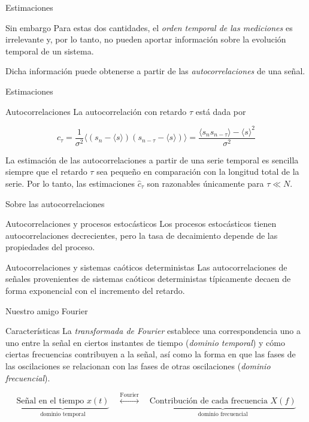 \documentclass[11pt]{beamer}
\begin{document}
\begin{frame}{Estimaciones}
	\begin{block}{Sin embargo}
		Para estas dos cantidades, el\textit{ orden temporal de las mediciones} es irrelevante y, por lo tanto, no pueden aportar información sobre la evolución temporal de un sistema.
	\end{block}
	
	\begin{block}{}
		Dicha información puede obtenerse a partir de las \emph{autocorrelaciones} de una señal.
	\end{block}
\end{frame}

\begin{frame}{Estimaciones}
	\begin{block}{Autocorrelaciones}
	La autocorrelación con retardo $\tau$ está dada por

\begin{equation}
c_{\tau} = \frac{1}{\sigma^2} \langle (s_n - \langle s \rangle)(s_{n-\tau} - \langle s \rangle) \rangle 
= \frac{\langle s_n s_{n-\tau} \rangle - \langle s \rangle^2}{\sigma^2}
\end{equation}

La estimación de las autocorrelaciones a partir de una serie temporal es sencilla siempre que el retardo $\tau$ sea pequeño en comparación con la longitud total de la serie. Por lo tanto, las estimaciones $\hat{c}_\tau$ son razonables únicamente para $\tau \ll N$.  
	\end{block}
\end{frame}

\begin{frame}{Sobre las autocorrelaciones}
	\begin{block}{Autocorrelaciones y procesos estocásticos}
		Los procesos estocásticos tienen autocorrelaciones decrecientes, pero la tasa de decaimiento depende de las propiedades del proceso.
	\end{block}
	
	\begin{block}{Autocorrelaciones y sistemas caóticos deterministas}
		Las autocorrelaciones de señales provenientes de sistemas caóticos deterministas típicamente decaen de forma exponencial con el incremento del retardo.
	\end{block}
\end{frame}

\begin{frame}{Nuestro amigo Fourier}
	\begin{block}{Características}
		La \emph{transformada de Fourier} establece una correspondencia uno a uno entre la señal en ciertos instantes de tiempo (\emph{dominio temporal}) y cómo ciertas frecuencias contribuyen a la señal, así como la forma en que las fases de las oscilaciones se relacionan con las fases de otras oscilaciones (\emph{dominio frecuencial}).
	\end{block}
	\[
        \underbrace{\text{Señal en el tiempo } x(t)}_{\text{dominio temporal}}
        \quad \overset{\text{Fourier}}{\longleftrightarrow} \quad
        \underbrace{\text{Contribución de cada frecuencia } X(f)}_{\text{dominio frecuencial}}
        \]
\end{frame}
\end{document}
